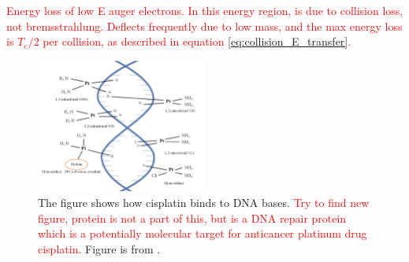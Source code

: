 \textcolor{red}{Energy loss of low E auger electrons. In this energy region, is due to collision loss, not bremsstrahlung. Deflects frequently due to low mass, and the max energy loss is $T_e/2$ per collision, as described in equation \ref{eq:collision_E_transfer}. }






\begin{figure}
    \centering
    \includegraphics[width=0.5\textwidth]{Theory/cisplatin_DNA.png}
    \caption{The figure shows how cisplatin binds to DNA bases. \textcolor{red}{Try to find new figure, protein is not a part of this, but is a DNA repair protein which is a potentially molecular target for anticancer platinum drug cisplatin. }Figure is from \cite{Ratanaphan2011}. %
    }
    \label{fig:cisplatin_DNA}
\end{figure}





